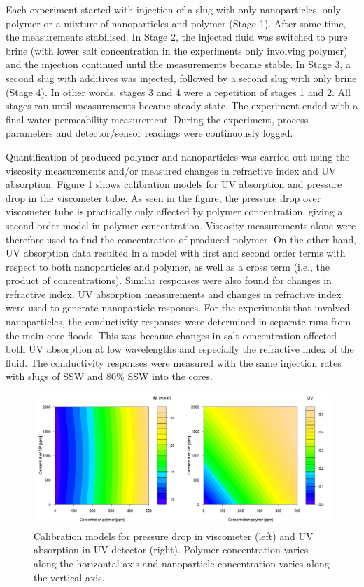 Each experiment started with injection of a slug with only nanoparticles, only polymer or a mixture of nanoparticles and polymer (Stage 1). After some time, the measurements stabilised. In Stage 2, the injected fluid was switched to pure brine (with lower salt concentration in the experiments only involving polymer) and the injection continued until the measurements became stable. In Stage 3, a second slug with additives was injected, followed by a second slug with only brine (Stage 4). In other words, stages 3 and 4 were a repetition of stages 1 and 2. All stages ran until measurements became steady state. The experiment ended with a final water permeability measurement. During the experiment, process parameters and detector/sensor readings were continuously logged.

Quantification of produced polymer and nanoparticles was carried out using the viscosity measurements and/or measured changes in refractive index and UV absorption. Figure \ref{cht:uv} shows calibration models for UV absorption and pressure drop in the viscometer tube. As seen in the figure, the pressure drop over viscometer tube is practically only affected by polymer concentration, giving a second order model in polymer concentration. Viscosity measurements alone were therefore used to find the concentration of produced polymer. On the other hand, UV absorption data resulted in a model with first and second order terms with respect to both nanoparticles and polymer, as well as a cross term (i.e., the product of concentrations). Similar responses were also found for changes in refractive index. UV absorption measurements and changes in refractive index were used to generate nanoparticle responses. For the experiments that involved nanoparticles, the conductivity responses were determined in separate runs from the main core floods. This was because changes in salt concentration affected both UV absorption at low wavelengths and especially the refractive index of the fluid. The conductivity responses were measured with the same injection rates with slugs of SSW and 80\% SSW into the cores.

\begin{figure}[h]
    \centering
    \includegraphics[width=\textwidth]{img/cht/uvDetector.png}
    \caption{Calibration models for pressure drop in viscometer (left) and UV absorption in UV detector (right). Polymer concentration varies along the horizontal axis and nanoparticle concentration varies along the vertical axis.}
    \label{cht:uv}
\end{figure}

